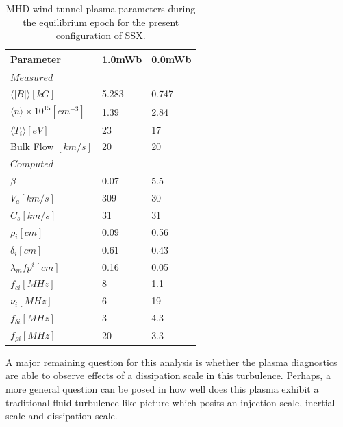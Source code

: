 \documentclass[aip,prl,amsmath,amssymb,reprint,superscriptaddress]{revtex4-1} %
\begin{document}




\begin{table}
\caption{\label{tab:params}MHD wind tunnel plasma parameters during the equilibrium epoch for the present configuration of SSX.}
\begin{tabular}{|l|l|l|}
\hline
Parameter&1.0mWb&0.0mWb\\
\hline
$Measured$&&\\
\hline
$\langle |B|\rangle [kG]$&5.283&0.747\\
$\langle n\rangle \times 10^{15} [cm^{-3}]$&1.39&2.84\\
$\langle T_{i}\rangle [eV]$&23&17\\
Bulk Flow $[km/s]$&20&20\\
\hline
$Computed$&&\\
\hline
$\beta$&0.07&5.5\\
$V_{a} [km/s]$&309&30\\
$C_{s} [km/s]$&31&31\\
$\rho_{i} [cm]$&0.09&0.56\\
$\delta_{i} [cm]$&0.61&0.43\\
$\lambda_mfp^{i} [cm]$&0.16&0.05\\
$f_{ci} [MHz]$&8&1.1\\
$\nu_{i} [MHz]$&6&19\\
$f_{\delta i} [MHz]$&3&4.3\\
$f_{\rho i} [MHz]$&20&3.3\\
\hline
\end{tabular}
\end{table}

A major remaining question for this analysis is whether the plasma diagnostics are able to observe effects of a dissipation scale in this turbulence. Perhaps, a more general question can be posed in how well does this plasma exhibit a traditional fluid-turbulence-like picture which posits an injection scale, inertial scale and dissipation scale.
\end{document}
